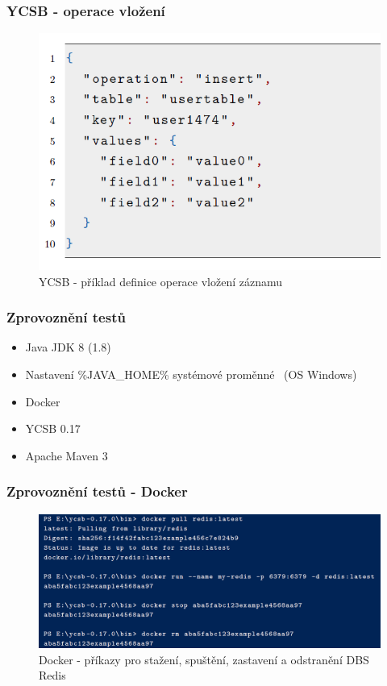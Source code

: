 \documentclass{beamer}
\begin{document}
	\begin{frame}
		\frametitle{YCSB - operace vložení}
		\begin{figure}
			\centering
			\includegraphics[scale=0.53]{Figures/ycsb_insert.PNG}
			\caption{YCSB - příklad definice operace vložení záznamu}
		\end{figure}
	\end{frame}
	
	\begin{frame}
		\frametitle{Zprovoznění testů}
		\begin{itemize}
			\item Java JDK 8 (1.8)~{\footnotesize\cite{java-jdk}}
			\item Nastavení \%JAVA\_HOME\% systémové proměnné~{\footnotesize\cite{win-env-var}} {\footnotesize(OS Windows)}
			\item Docker~{\footnotesize\cite{docker}}
			\item YCSB 0.17~{\footnotesize\cite{ycsb-download}}
			\item Apache Maven 3~{\footnotesize\cite{maven}}
			
		\end{itemize}
	\end{frame}

	\begin{frame}
		\frametitle{Zprovoznění testů - Docker}
		\begin{figure}
			\centering
			\includegraphics[scale=0.37]{Figures/docker_commands.PNG}
			\caption{Docker - příkazy pro stažení, spuštění, zastavení a odstranění DBS Redis}
		\end{figure}
	\end{frame}
	
\end{document}
